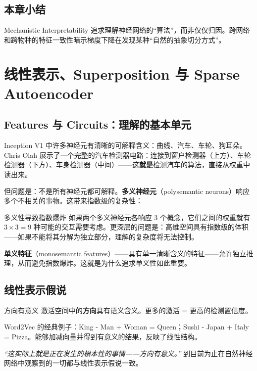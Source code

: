 \documentclass[a4paper]{article}
\begin{document}
\subsection{本章小结}

Mechanistic Interpretability 追求理解神经网络的``算法''，而非仅仅归因。跨网络和跨物种的特征一致性暗示梯度下降在发现某种``自然的抽象切分方式''。

\section{线性表示、Superposition 与 Sparse Autoencoder}

\subsection{Features 与 Circuits：理解的基本单元}

Inception V1 中许多神经元有清晰的可解释含义：曲线、汽车、车轮、狗耳朵。Chris Olah 展示了一个完整的汽车检测器电路：连接到窗户检测器（上方）、车轮检测器（下方）、车身检测器（中间）——这\textbf{就是}检测汽车的算法，直接从权重中读出来。

但问题是：不是所有神经元都可解释。\textbf{多义神经元}（polysemantic neurons）响应多个不相关的事物。这带来指数级的复杂性：

\begin{warningbox}{多义性导致指数爆炸}
如果两个多义神经元各响应 3 个概念，它们之间的权重就有 $3 \times 3 = 9$ 种可能的交互需要考虑。更深层的问题是：高维空间具有指数级的体积——如果不能将其分解为独立部分，理解的复杂度将无法控制。

\textbf{单义特征}（monosemantic features）——具有单一清晰含义的特征——允许独立推理，从而避免指数爆炸。这就是为什么追求单义性如此重要。
\end{warningbox}

\subsection{线性表示假说}

\begin{importantbox}{方向有意义}
激活空间中的\textbf{方向}具有语义含义。更多的激活 = 更高的检测置信度。

Word2Vec 的经典例子：King - Man + Woman = Queen；Sushi - Japan + Italy = Pizza。能够加减向量并得到有意义的结果，反映了线性结构。

\textit{``这实际上就是正在发生的根本性的事情——方向有意义。''} 到目前为止在自然神经网络中观察到的一切都与线性表示假说一致。
\end{importantbox}
\end{document}
